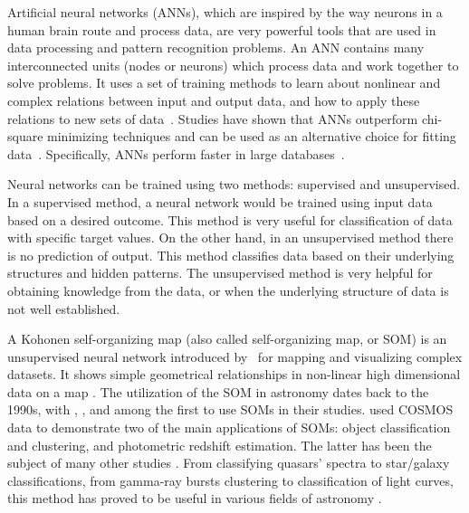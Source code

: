 Artificial neural networks (ANNs), which are inspired by the way neurons in a human brain route and process data, are very powerful tools that are used in data processing and pattern recognition problems.
An ANN contains many interconnected units (nodes or neurons) which process data and work together to solve problems.
It uses a set of training methods to learn about nonlinear and complex relations between input and output data, and how to apply these relations to new sets of data~\citep[e.g.][]{Hossein14,Hossein16,Ellison16a, Ellison16b}.
Studies have shown that ANNs outperform chi-square minimizing techniques and can be used as an alternative choice for fitting data~\citep[e.g.][]{Marquez91}.
Specifically, ANNs perform faster in large databases~\citep[][]{Gulati97}.

Neural networks can be trained using two methods: supervised and unsupervised.
In a supervised method, a neural network would be trained using input data based on a desired outcome.
This method is very useful for classification of data with specific target values.
On the other hand, in an unsupervised method there is no prediction of output.
This method classifies data based on their underlying structures and hidden patterns.
The unsupervised method is very helpful for obtaining knowledge from the data, or when the underlying structure of data is not well established.

A Kohonen self-organizing map (also called self-organizing map, or SOM) is an unsupervised neural network introduced by~\citet{Kohonen82} for mapping and visualizing complex datasets.
It shows simple geometrical relationships in non-linear high dimensional data on a map \citep{Kohonen98}.
The utilization of the SOM in astronomy dates back to the 1990s, with \citet[][]{Odewahn92}, \citet[][]{Hernandez94}, and \citet[][]{Murtagh95} among the first to use SOMs in their studies.
\citet{Geach12} used COSMOS data to demonstrate two of the main applications of SOMs: object classification and clustering, and photometric redshift estimation. The latter has been the subject of many other studies \citep[e.g.][]{Kind14a}.
From classifying quasars' spectra to star/galaxy classifications, from gamma-ray bursts clustering to classification of light curves, this method has proved to be useful in various fields of astronomy \citep[e.g.][]{Maehoenen95, Miller96, Andreon00, Balastegui01, Rajaniemi02, Brett04, Scaringi09}.


